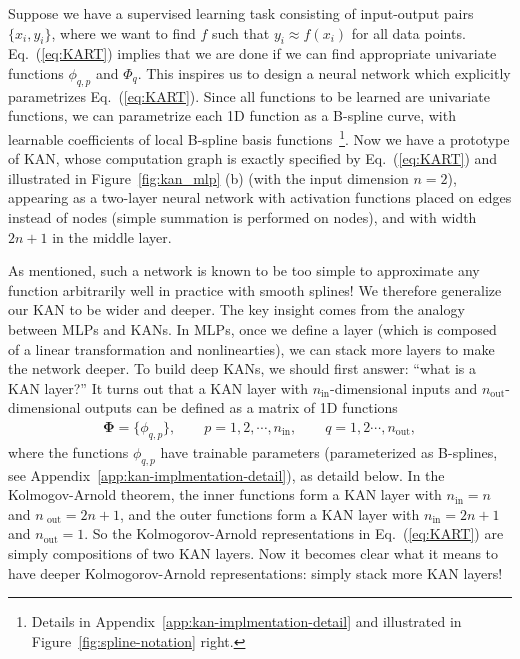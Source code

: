 \documentclass[12pt]{caltech_thesis}
\numberwithin{equation}{section}
\begin{document}
Suppose we have a supervised learning task consisting of input-output pairs $\{x_i,y_i\}$, where we want to find $f$ such that $y_i\approx f(x_i)$ for all data points.
Eq.~(\ref{eq:KART}) implies that we are done if we can find appropriate univariate functions $\phi_{q,p}$ and $\Phi_q$. This inspires us to design a neural network which explicitly parametrizes Eq.~(\ref{eq:KART}). Since all functions to be learned are univariate functions, we can parametrize each 1D function as a B-spline curve, with learnable coefficients of local B-spline basis functions~\footnote{Details in Appendix~\ref{app:kan-implmentation-detail} and illustrated in Figure~\ref{fig:spline-notation} right.}. Now we have a prototype of KAN, whose computation graph is exactly specified by Eq.~(\ref{eq:KART}) and  illustrated in Figure~\ref{fig:kan_mlp} (b) (with the input dimension $n=2$), appearing as a two-layer neural network with activation functions placed on edges instead of nodes (simple summation is performed on nodes), and with width $2n+1$ in the middle layer.

As mentioned, such a network is known to be too simple to approximate any function arbitrarily well in practice with smooth splines! %
We therefore generalize our KAN to be wider and deeper. %
The key insight comes from the analogy between MLPs and KANs. In MLPs, once we define a layer (which is composed of a linear transformation and nonlinearties), we can stack more layers to make the network deeper. To build deep KANs, we should first answer: ``what is a KAN layer?'' It turns out that a KAN layer with $n_{\text{in}}$-dimensional inputs and $n_{\text{out}}$-dimensional outputs can be defined as a matrix of 1D functions 
\begin{align}
    {\mathbf\Phi}=\{\phi_{q,p}\},\qquad p=1,2,\cdots,n_{\text{in}},\qquad q=1,2\cdots,n_{\text{out}},
\end{align}
where the functions $\phi_{q,p}$ have trainable parameters (parameterized as B-splines, see Appendix~\ref{app:kan-implmentation-detail}), as detaild below. In the Kolmogov-Arnold theorem, the inner functions form a KAN layer with $n_{\text{in}}=n$ and $n_{\text{ out}}=2n+1$, and the outer functions form a KAN layer with $n_{\text{in}}=2n+1$ and $n_{\text{out}}=1$. So the Kolmogorov-Arnold representations in Eq.~(\ref{eq:KART}) are simply compositions of two KAN layers. Now it becomes clear what it means to have deeper Kolmogorov-Arnold representations: simply stack more KAN layers!
\end{document}

